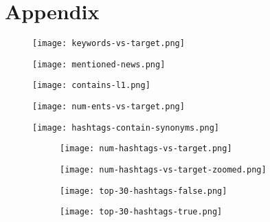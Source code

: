 \clearpage

\section{Appendix}
\begin{figure}[h!]
  \centering
  \texttt{[image: keywords-vs-target.png]}
  \caption{}
  \label{fig:keywords-vs-target}
\end{figure}

\begin{figure}[h!]
  \centering
  \texttt{[image: mentioned-news.png]}
  \caption{}
  \label{fig:mentioned-news}
\end{figure}

\begin{figure}[h!]
  \centering
  \texttt{[image: contains-l1.png]}
  \caption{}
  \label{fig:contains-l1}
\end{figure}

\begin{figure}[h!]
  \centering
  \texttt{[image: num-ents-vs-target.png]}
  \caption{}
  \label{fig:num-ents-vs-target}
\end{figure}


\begin{figure}[h!]
  \centering
  \texttt{[image: hashtags-contain-synonyms.png]}
  \caption{}
  \label{fig:hashtags-contain-synonyms}
\end{figure}

\begin{figure}[h!]
     \centering
     \begin{subfigure}[b]{0.42\textwidth}
         \centering
         \texttt{[image: num-hashtags-vs-target.png]}
         \caption{}
         \label{fig:num-hashtags-vs-target}
     \end{subfigure}
     \begin{subfigure}[b]{0.42\textwidth}
         \centering
         \texttt{[image: num-hashtags-vs-target-zoomed.png]}
         \caption{}
         \label{fig:num-hashtags-vs-target-zoomed}
     \end{subfigure}
        \caption{}
        \label{fig:num-hashtags-graphs}
\end{figure}

\begin{figure}[h!]
     \centering
     \begin{subfigure}[b]{0.42\textwidth}
         \centering
         \texttt{[image: top-30-hashtags-false.png]}
         \caption{}
         \label{fig:top-30-hashtags-false}
     \end{subfigure}
     \begin{subfigure}[b]{0.42\textwidth}
         \centering
         \texttt{[image: top-30-hashtags-true.png]}
         \caption{}
         \label{fig:top-30-hashtags-true}
     \end{subfigure}
        \caption{}
        \label{fig:top-30-hashtags-graphs}
\end{figure}


